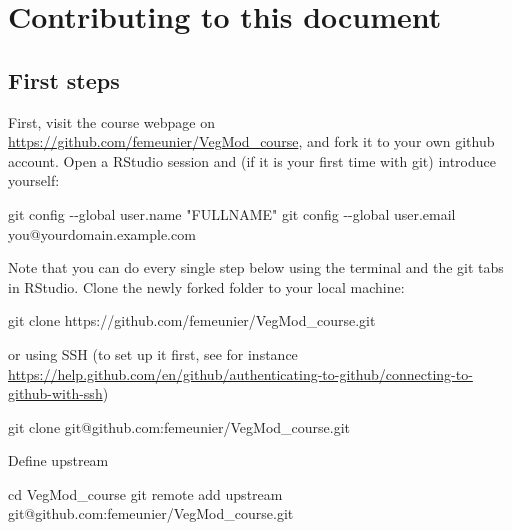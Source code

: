 \documentclass[
  oneside]{book}
\newenvironment{Shaded}{\begin{snugshade}}{\end{snugshade}}
\newcommand{\BuiltInTok}[1]{#1}
\newcommand{\FunctionTok}[1]{\textcolor[rgb]{0.00,0.00,0.00}{#1}}
\newcommand{\NormalTok}[1]{#1}
\newcommand{\StringTok}[1]{\textcolor[rgb]{0.31,0.60,0.02}{#1}}
\begin{document}
\hypertarget{contributing-to-this-document}{%
\chapter*{Contributing to this document}\label{contributing-to-this-document}}

\hypertarget{first-steps}{%
\section*{First steps}\label{first-steps}}

First, visit the course webpage on \url{https://github.com/femeunier/VegMod_course}, and fork it to your own github account. Open a RStudio session and (if it is your first time with git) introduce yourself:

\begin{Shaded}
\begin{Highlighting}[]
\FunctionTok{git}\NormalTok{ config {-}{-}global user.name }\StringTok{"FULLNAME"}
\FunctionTok{git}\NormalTok{ config {-}{-}global user.email you@yourdomain.example.com}
\end{Highlighting}
\end{Shaded}

Note that you can do every single step below using the terminal and the git tabs in RStudio. Clone the newly forked folder to your local machine:

\begin{Shaded}
\begin{Highlighting}[]
\FunctionTok{git}\NormalTok{ clone https://github.com/femeunier/VegMod\_course.git}
\end{Highlighting}
\end{Shaded}

or using SSH (to set up it first, see for instance \url{https://help.github.com/en/github/authenticating-to-github/connecting-to-github-with-ssh})

\begin{Shaded}
\begin{Highlighting}[]
\FunctionTok{git}\NormalTok{ clone git@github.com:femeunier/VegMod\_course.git}
\end{Highlighting}
\end{Shaded}

Define upstream

\begin{Shaded}
\begin{Highlighting}[]
\BuiltInTok{cd}\NormalTok{ VegMod\_course}
\FunctionTok{git}\NormalTok{ remote add upstream git@github.com:femeunier/VegMod\_course.git}
\end{Highlighting}
\end{Shaded}
\end{document}
